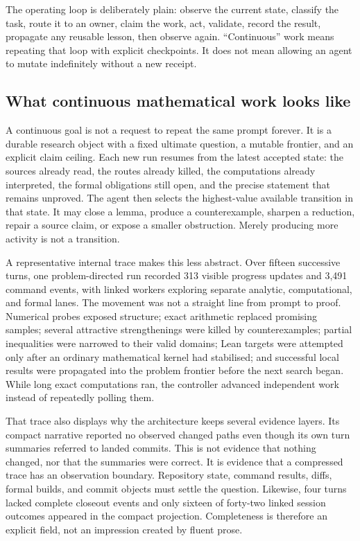 \documentclass[10pt]{article}
\begin{document}
The operating loop is deliberately plain: observe the current state, classify
the task, route it to an owner, claim the work, act, validate, record the
result, propagate any reusable lesson, then observe again. ``Continuous'' work
means repeating that loop with explicit checkpoints. It does not mean allowing
an agent to mutate indefinitely without a new receipt.

\subsection{What continuous mathematical work looks like}

A continuous goal is not a request to repeat the same prompt forever. It is a
durable research object with a fixed ultimate question, a mutable frontier,
and an explicit claim ceiling. Each new run resumes from the latest accepted
state: the sources already read, the routes already killed, the computations
already interpreted, the formal obligations still open, and the precise
statement that remains unproved. The agent then selects the highest-value
available transition in that state. It may close a lemma, produce a
counterexample, sharpen a reduction, repair a source claim, or expose a
smaller obstruction. Merely producing more activity is not a transition.

A representative internal trace makes this less abstract. Over fifteen
successive turns, one problem-directed run recorded 313 visible progress
updates and 3,491 command events, with linked workers exploring separate
analytic, computational, and formal lanes. The movement was not a straight
line from prompt to proof. Numerical probes exposed structure; exact arithmetic
replaced promising samples; several attractive strengthenings were killed by
counterexamples; partial inequalities were narrowed to their valid domains;
Lean targets were attempted only after an ordinary mathematical kernel had
stabilised; and successful local results were propagated into the problem
frontier before the next search began. While long exact computations ran, the
controller advanced independent work instead of repeatedly polling them.

That trace also displays why the architecture keeps several evidence layers.
Its compact narrative reported no observed changed paths even though its own
turn summaries referred to landed commits. This is not evidence that nothing
changed, nor that the summaries were correct. It is evidence that a compressed
trace has an observation boundary. Repository state, command results, diffs,
formal builds, and commit objects must settle the question. Likewise, four
turns lacked complete closeout events and only sixteen of forty-two linked
session outcomes appeared in the compact projection. Completeness is therefore
an explicit field, not an impression created by fluent prose.
\end{document}
